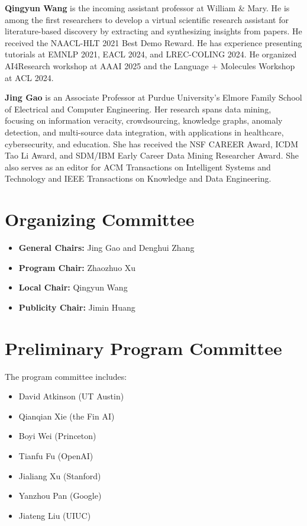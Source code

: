 \documentclass[conference]{IEEEtran}
\begin{document}
\noindent \textbf{Qingyun Wang} is the incoming assistant professor at William \& Mary. He is among the first researchers to develop a virtual scientific research assistant for literature-based discovery by extracting and synthesizing insights from papers. He received the NAACL-HLT 2021 Best Demo Reward. He has experience presenting tutorials at EMNLP 2021, EACL 2024, and LREC-COLING 2024. He organized AI4Research workshop at AAAI 2025 and the Language + Molecules Workshop at ACL 2024. 

\noindent \textbf{Jing Gao} is an Associate Professor at Purdue University's Elmore Family School of Electrical and Computer Engineering. Her research spans data mining, focusing on information veracity, crowdsourcing, knowledge graphs, anomaly detection, and multi-source data integration, with applications in healthcare, cybersecurity, and education.
She has received the NSF CAREER Award, ICDM Tao Li Award, and SDM/IBM Early Career Data Mining Researcher Award. She also serves as an editor for ACM Transactions on Intelligent Systems and Technology and IEEE Transactions on Knowledge and Data Engineering.

\section{Organizing Committee}
\begin{itemize}
    \item \textbf{General Chairs:} Jing Gao and Denghui Zhang
    \item \textbf{Program Chair:} Zhaozhuo Xu
    \item \textbf{Local Chair:} Qingyun Wang
    \item \textbf{Publicity Chair:} Jimin Huang
\end{itemize}

\section{Preliminary Program Committee}
The program committee includes:
\begin{itemize}
    \item David Atkinson (UT Austin)
    \item Qianqian Xie (the Fin AI)
    \item Boyi Wei (Princeton)
    \item Tianfu Fu (OpenAI)
    \item Jialiang Xu (Stanford)
    \item Yanzhou Pan (Google)
    \item Jiateng Liu (UIUC)
\end{itemize}
\end{document}
